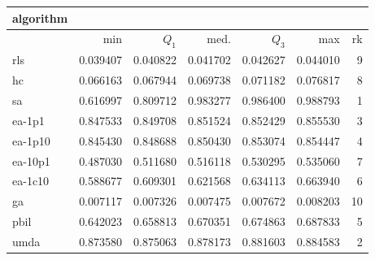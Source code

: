 \begin{tabular}{@{}l*{5}{>{{}}N{1}{3}}>{{}}N{2}{0}@{}}
\toprule
{algorithm} &  \\
\midrule
& {min} & {$Q_1$} & {med.} & {$Q_3$} & {max} & {rk}\\
\midrule
rls & 0.039407 & 0.040822 & 0.041702 & 0.042627 & 0.044010 & 9\\
hc & 0.066163 & 0.067944 & 0.069738 & 0.071182 & 0.076817 & 8\\
sa & 0.616997 & 0.809712 & {\color{blue}} 0.983277 & {\color{blue}} 0.986400 & {\color{blue}} 0.988793 & 1\\
ea-1p1 & 0.847533 & 0.849708 & 0.851524 & 0.852429 & 0.855530 & 3\\
ea-1p10 & 0.845430 & 0.848688 & 0.850430 & 0.853074 & 0.854447 & 4\\
ea-10p1 & 0.487030 & 0.511680 & 0.516118 & 0.530295 & 0.535060 & 7\\
ea-1c10 & 0.588677 & 0.609301 & 0.621568 & 0.634113 & 0.663940 & 6\\
ga & 0.007117 & 0.007326 & 0.007475 & 0.007672 & 0.008203 & 10\\
pbil & 0.642023 & 0.658813 & 0.670351 & 0.674863 & 0.687833 & 5\\
umda & {\color{blue}} 0.873580 & {\color{blue}} 0.875063 & 0.878173 & 0.881603 & 0.884583 & 2\\
\bottomrule
\end{tabular}
